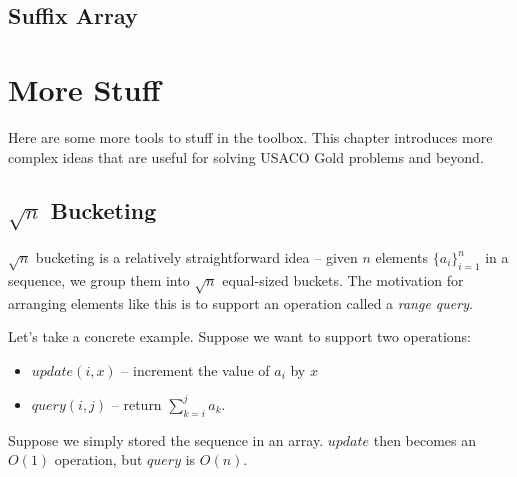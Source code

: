 \documentclass[11pt]{book}
\begin{document}
\section{Suffix Array}

\chapter{More Stuff}

Here are some more tools to stuff in the toolbox. This chapter introduces more complex ideas that are useful for solving USACO Gold problems and beyond.

\section{$\sqrt{n}$ Bucketing}

$\sqrt{n}$ bucketing is a relatively straightforward idea -- given $n$ elements $\{a_i\}_{i=1}^n$ in a sequence, we group them into $\sqrt{n}$ equal-sized buckets. The motivation for arranging elements like this is to support an operation called a \textit{range query}.

Let's take a concrete example. Suppose we want to support two operations:

\begin{itemize}
\item
$update(i, x)$ -- increment the value of $a_i$ by $x$

\item
$query(i, j)$ -- return $\sum_{k=i}^j a_k$.
\end{itemize}

Suppose we simply stored the sequence in an array. $update$ then becomes an $O(1)$ operation, but $query$ is $O(n)$.

\begin{center}
{
}
\end{center}
\end{document}
